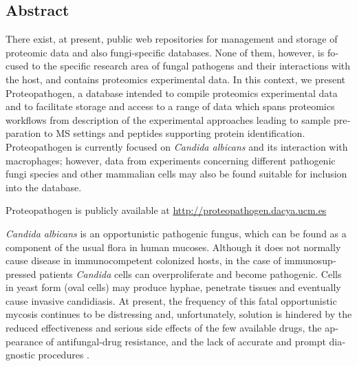 \begin{otherlanguage}{british}
\newpage

%
%



\chapter*{Abstract}

There exist, at present, public web repositories for management and storage of proteomic
data and also fungi-specific databases. None of them, however, is focused to the specific
research area of fungal pathogens and their interactions with the host, and contains
proteomics experimental data. In this context, we present Proteopathogen, a database
intended to compile proteomics experimental data and to facilitate storage and access to a
range of data which spans proteomics workflows from description of the experimental
approaches leading to sample preparation to MS settings and peptides supporting protein
identification. Proteopathogen is currently focused on \textit{Candida albicans} and its interaction
with macrophages; however, data from experiments concerning different pathogenic fungi
species and other mammalian cells may also be found suitable for inclusion into the database. 

Proteopathogen is publicly available at \href{http://proteopathogen.dacya.ucm.es}{http://proteopathogen.dacya.ucm.es}

\newpage{}

\textit{Candida albicans} is an opportunistic pathogenic fungus,
which can be found as a component of the usual flora in
human mucoses. Although it does not normally cause
disease in immunocompetent colonized hosts, in the case
of immunosuppressed patients \textit{Candida} cells can overproliferate
 and become pathogenic. Cells in yeast form (oval
cells) may produce hyphae, penetrate tissues and eventually
cause invasive candidiasis. At present, the frequency of this
fatal opportunistic mycosis continues to be distressing and,
unfortunately, solution is hindered by the reduced effectiveness
 and serious side effects of the few available drugs,
the appearance of antifungal-drug resistance, and the lack of
accurate and prompt diagnostic procedures \citep{Calderone2012}.


\end{otherlanguage}
